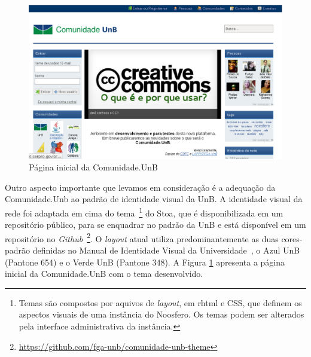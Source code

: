 \begin{figure}[h]
    \centering
    \includegraphics[keepaspectratio=true,scale=0.4]
      {figuras/comunidade.unb.br.eps}
    \caption{Página inicial da Comunidade.UnB}
    \label{comunidade-unb}
\end{figure}

Outro aspecto importante que levamos em consideração é a adequação da
Comunidade.Unb ao padrão de identidade visual da UnB.
A identidade visual da rede foi adaptada em cima do tema~\footnote{Temas são
compostos por aquivos de \textit{layout}, em rhtml e CSS, que definem os aspectos
visuais de uma instância do Noosfero. Os temas podem ser alterados pela interface
administrativa da instância.} do Stoa, que é disponibilizada em um repositório
público, para se enquadrar no padrão da UnB e está disponível em um repositório
no \textit{Github}~\footnote{\url{https://github.com/fga-unb/comunidade-unb-theme}}.
%
O \textit{layout} atual utiliza predominantemente as duas cores-padrão definidas
no Manual de Identidade Visual da Universidade~\cite{visualUnB}, o Azul UnB
(Pantone 654) e o Verde UnB (Pantone 348). A Figura \ref{comunidade-unb}
apresenta a página inicial da Comunidade.UnB com o tema desenvolvido.





